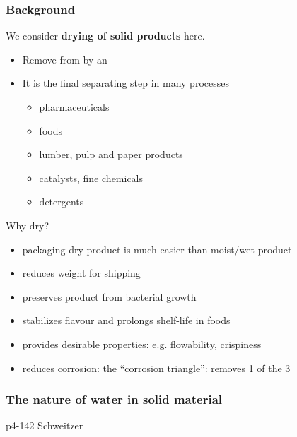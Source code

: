 \begin{frame}\frametitle{Background}
	We consider \textbf{drying of solid products} here.
	\begin{itemize}
		\item	Remove {\color{myOrange}{liquid phase}} from {\color{myOrange}{solid phase}} by an {\color{myOrange}{ESA = thermal energy}}
		\item	It is the final separating step in many processes
		\begin{itemize}
			\item	pharmaceuticals
			\item	foods
			\item	lumber, pulp and paper products
			\item	catalysts, fine chemicals
			\item	detergents
		\end{itemize}
	\end{itemize}
	Why dry?
	\begin{itemize}
		\item	packaging dry product is much easier than moist/wet product
		\item	reduces weight for shipping
		\item	preserves product from bacterial growth
		\item	stabilizes flavour and prolongs shelf-life in foods
		\item	provides desirable properties: e.g. flowability, crispiness
		\item	reduces corrosion: the ``corrosion triangle'': removes 1 of the 3
	\end{itemize}
\end{frame}

\begin{frame}\frametitle{The nature of water in solid material}
	p4-142 Schweitzer
	
\end{frame}

